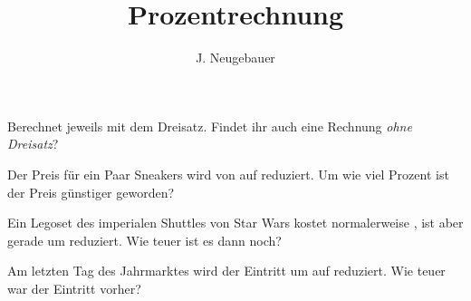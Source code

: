 \documentclass[10pt, a5paper, landscape]{scrartcl}
\author{J. Neugebauer}
\title{Prozentrechnung}
\date{\Heute}
\begin{document}
\TITEL

Berechnet jeweils mit dem Dreisatz. Findet ihr auch eine Rechnung \emph{ohne Dreisatz}?

\begin{aufgabe}[subtitle=Räume: 1 | 4 | 7]
	\label{aufg:prozentsatz}
	Der Preis für ein Paar Sneakers wird von  auf  reduziert. Um wie viel Prozent ist der Preis günstiger geworden?
\end{aufgabe}

\begin{aufgabe}[subtitle=Räume: 2 | 5 | 8]
	\label{aufg:prozentwert}
	Ein Legoset des imperialen Shuttles von Star Wars kostet normalerweise , ist aber gerade um  reduziert. Wie teuer ist es dann noch?
\end{aufgabe}

\begin{aufgabe}[subtitle=Räume: 3 | 6 | 9]
	\label{aufg:grundwert}
	Am letzten Tag des Jahrmarktes wird der Eintritt um  auf  reduziert. Wie teuer war der Eintritt vorher?
\end{aufgabe}
\end{document}
